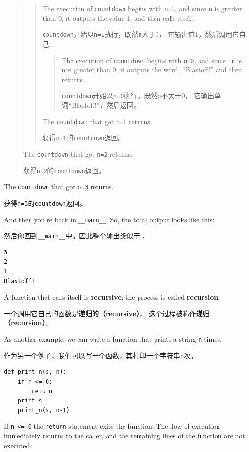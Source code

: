 \documentclass[10pt]{book}
\begin{document}
\begin{CJK}{UTF8}{gbsn}
\begin{quote}
\begin{quote}
The execution of {\tt countdown} begins with {\tt n=1}, and since
{\tt n} is greater than 0, it outputs the value 1, and then calls itself...

{\tt countdown}开始以{\tt n=1}执行，既然{\tt n}大于0，
它输出值1，然后调用它自己...

\begin{quote}
The execution of {\tt countdown} begins with {\tt n=0}, and since {\tt
n} is not greater than 0, it outputs the word, ``Blastoff!'' and then
returns.

{\tt countdown}开始以{\tt n=0}执行，既然{\tt n}不大于0，
它输出单词``Blastoff!''，然后返回。

\end{quote}

The {\tt countdown} that got {\tt n=1} returns.

获得{\tt n=1}的{\tt countdown}返回。

\end{quote}

The {\tt countdown} that got {\tt n=2} returns.

获得{\tt n=2}的{\tt countdown}返回。

\end{quote}

The {\tt countdown} that got {\tt n=3} returns.

获得{\tt n=3}的{\tt countdown}返回。

And then you're back in \verb"__main__".  So, the
total output looks like this:

然后你回到\verb"__main__"中。因此整个输出类似于：

\begin{verbatim}
3
2
1
Blastoff!
\end{verbatim}
%
A function that calls itself is {\bf recursive}; the process is
called {\bf recursion}.

一个调用它自己的函数是{\bf 递归的（recursive）}，
这个过程被称作{\bf 递归（recursion）}。

As another example, we can write a function that prints a
string {\tt n} times.

作为另一个例子，我们可以写一个函数，其打印一个字符串{\tt n}次。

\begin{verbatim}
def print_n(s, n):
    if n <= 0:
        return
    print s
    print_n(s, n-1)
\end{verbatim}
%
If {\tt n <= 0} the {\tt return} statement exits the function.  The
flow of execution immediately returns to the caller, and the remaining
lines of the function are not executed.


\end{CJK}
\end{document}
